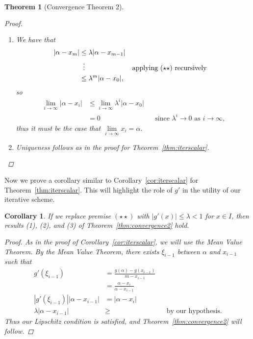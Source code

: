 \documentclass[12pt,letterpaper,DIV=11]{scrartcl}
\theoremstyle{plain}
\newtheorem{theorem}{Theorem}[section]
\newtheorem{corollary}{Corollary}
\theoremstyle{definition}
\theoremstyle{remark}
\begin{document}
\begin{theorem}[Convergence Theorem 2]
\begin{proof}
\begin{enumerate}
      \item We have that \begin{align*}
          |\alpha - x_m| &\leq \lambda |\alpha - x_{m - 1}| \\
                         &\vdotswithin{\leq} && \text{applying $(\star\star)$ recursively} \\
                         &\leq \lambda^m |\alpha - x_0|,
          \end{align*} so \begin{align*}
          \lim_{i \to \infty} |\alpha - x_i| &\leq \lim_{i \to \infty} \lambda^i |\alpha - x_0| \\
                                             &= 0 && \text{since $\lambda^i \to 0$ as $i \to \infty$},
        \end{align*} thus it must be the case that $\lim\limits_{i \to \infty} x_i = \alpha$.

      \item Uniqueness follows as in the proof for Theorem~\ref{thm:iterscalar}.
        \qedhere
    \end{enumerate}
  \end{proof}
\end{theorem}
Now we prove a corollary similar to Corollary~\ref{cor:iterscalar} for Theorem~\ref{thm:iterscalar}.
This will highlight the role of $g'$ in the utility of our iterative scheme.
\begin{corollary}\label{cor:upperboundg'}
  If we replace premise $(\star\star)$ with $|g'(x)| \leq \lambda < 1$ for $x \in I$, then results (1), (2), and (3) of Theorem~\ref{thm:convergence2} hold.
  \begin{proof}
    As in the proof of Corollary~\ref{cor:iterscalar}, we will use the Mean Value Theorem.
    By the Mean Value Theorem, there exists $\xi_{i - 1}$ between $\alpha$ and $x_{i - 1}$ such that \begin{align*}
      g'(\xi_{i - 1}) &= \frac{g(\alpha) - g(x_{i - 1})}{m - x_{i - 1}} \\
                      &= \frac{\alpha - x_i}{\alpha - x_{i - 1}} \\
      |g'(\xi_{i - 1})| |\alpha - x_{i - 1}| &= |\alpha - x_i| \\
      \lambda |\alpha - x_{i - 1}| &\geq  && \text{by our hypothesis.}
    \end{align*}
    Thus our Lipschitz condition is satisfied, and Theorem~\ref{thm:convergence2} will follow.
  \end{proof}
\end{corollary}
\end{document}

